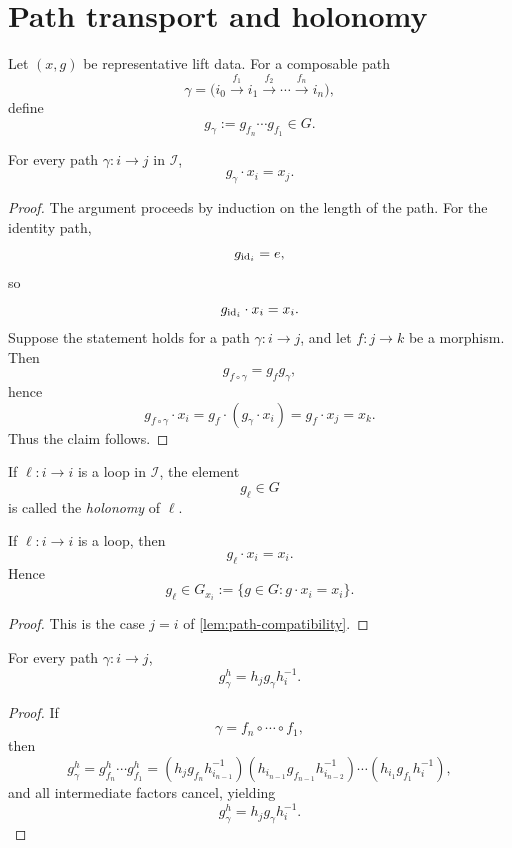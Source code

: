 \section{Path transport and holonomy}
\label{sec:lift-holonomy}
\begin{definition}
	Let \((x,g)\) be representative lift data.
	For a composable path
	\[
		\gamma=
		\bigl(
		i_0\xrightarrow{f_1}i_1\xrightarrow{f_2}\cdots\xrightarrow{f_n}i_n
		\bigr),
	\]
	define
	\[
		g_\gamma:=g_{f_n}\cdots g_{f_1}\in G.
	\]
\end{definition}
\begin{lemma}
	\label{lem:path-compatibility}
	For every path \(\gamma:i\to j\) in \(\mathcal I\),
	\[
		g_\gamma\cdot x_i=x_j.
	\]
\end{lemma}
\begin{proof}
	The argument proceeds by induction on the length of the path.
	For the identity path,
	\[
		g_{\operatorname{id}_i}=e,
	\]
	so
	\[
		g_{\operatorname{id}_i}\cdot x_i=x_i.
	\]
	Suppose the statement holds for a path \(\gamma:i\to j\), and let
	\(f:j\to k\) be a morphism.
	Then
	\[
		g_{f\circ\gamma}=g_f g_\gamma,
	\]
	hence
	\[
		g_{f\circ\gamma}\cdot x_i
		=
		g_f\cdot(g_\gamma\cdot x_i)
		=
		g_f\cdot x_j
		=
		x_k.
	\]
	Thus the claim follows.
\end{proof}
\begin{definition}[Holonomy]
	If \(\ell:i\to i\) is a loop in \(\mathcal I\), the element
	\[
		g_\ell\in G
	\]
	is called the \emph{holonomy} of \(\ell\).
\end{definition}
\begin{lemma}
	If \(\ell:i\to i\) is a loop, then
	\[
		g_\ell\cdot x_i=x_i.
	\]
	Hence
	\[
		g_\ell\in G_{x_i}:=\{g\in G:g\cdot x_i=x_i\}.
	\]
\end{lemma}
\begin{proof}
	This is the case \(j=i\) of \cref{lem:path-compatibility}.
\end{proof}
\begin{lemma}
	\label{lem:path-conjugation}
	For every path \(\gamma:i\to j\),
	\[
		g_\gamma^h=h_j g_\gamma h_i^{-1}.
	\]
\end{lemma}
\begin{proof}
	If
	\[
		\gamma=f_n\circ\cdots\circ f_1,
	\]
	then
	\[
		g_\gamma^h
		=
		g_{f_n}^h\cdots g_{f_1}^h
		=
		(h_j g_{f_n} h_{i_{n-1}}^{-1})
		(h_{i_{n-1}} g_{f_{n-1}} h_{i_{n-2}}^{-1})
		\cdots
		(h_{i_1} g_{f_1} h_i^{-1}),
	\]
	and all intermediate factors cancel, yielding
	\[
		g_\gamma^h=h_j g_\gamma h_i^{-1}.
	\]
\end{proof}
